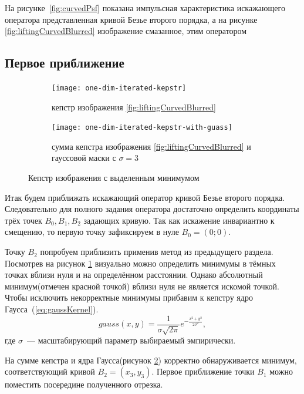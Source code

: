 На рисунке~\ref{fig:curvedPsf} показана импульсная характеристика искажающего оператора представленная кривой Безье второго порядка, а на рисунке \ref{fig:liftingCurvedBlurred} изображение смазанное, этим оператором

\subsection{Первое приближение}
\begin{figure}[h!]
	\begin{subfigure}[t]{0.5\textwidth}
		\texttt{[image: one-dim-iterated-kepstr]}
		\caption{кепстр изображения \ref{fig:liftingCurvedBlurred}}
		\label{fig:curvedKepstrUnmodified}
	\end{subfigure}
	\begin{subfigure}[t]{0.5\textwidth}
		\texttt{[image: one-dim-iterated-kepstr-with-guass]}
		\caption{сумма кепстра изображения \ref{fig:liftingCurvedBlurred} и гауссовой маски с $\sigma=3$}
		\label{fig:curvedKepstrWithGauss}
	\end{subfigure}
	\caption{Кепстр изображения с выделенным минимумом}
	\label{fig:}
\end{figure}

Итак будем приближать искажающий оператор кривой Безье второго порядка. Следовательно для полного задания оператора достаточно определить координаты трёх точек $B_0, B_1, B_2$ задающих кривую. Так как искажение инвариантно к смещению, то первую точку зафиксируем в нуле $B_0 = (0;0)$.

Точку $B_2$ попробуем приблизить применив метод из предыдущего раздела. Посмотрев на рисунок \ref{fig:curvedKepstrUnmodified} визуально можно определить минимумы в тёмных точках вблизи нуля и на определённом расстоянии. Однако абсолютный минимум(отмечен красной точкой) вблизи нуля не является искомой точкой. Чтобы исключить некорректные минимумы прибавим к кепстру ядро Гаусса~(\ref{eq:gaussKernel}).
\begin{equation}\label{eq:gaussKernel}
	gauss(x,y) = \frac{1}{\sigma\sqrt{2\pi}}e^{-\frac{x^2+y^2}{2\sigma^2}},
\end{equation}
где $\sigma$~--- масштабирующий параметр выбираемый эмпирически.

На сумме кепстра и ядра Гаусса(рисунок \ref{fig:curvedKepstrWithGauss}) корректно обнаруживается минимум, соответствующий кривой $B_2=(x_3,y_3)$. Первое приближение точки $B_1$ можно поместить посередине полученного отрезка.

